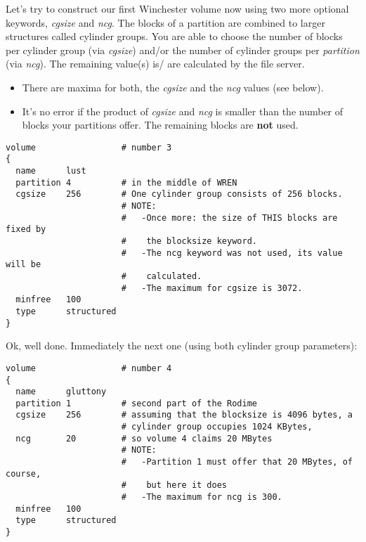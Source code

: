 Let's try to construct our first Winchester volume now using two more optional
keywords, {\it cgsize} and
{\it ncg}. The blocks of a partition are combined to
larger structures called cylinder groups. You are able to choose the number of
blocks per cylinder group (via {\it cgsize}) and/or the number of cylinder
groups per {\it partition} (via {\it ncg}). The remaining value(s) is\slash
are calculated by the file server.

\begin{note}

  \begin{itemize}

    \item There are maxima for both, the {\it cgsize} and the {\it ncg} values
          (see below).

    \item It's no error if the product of {\it cgsize} and {\it ncg} is
          smaller than the number of blocks your partitions offer. The
          remaining blocks are {\bf not} used.

  \end{itemize}

\end{note}

\begin{listing}
  \begin{verbatim}
volume                 # number 3
{
  name      lust       
  partition 4          # in the middle of WREN
  cgsize    256        # One cylinder group consists of 256 blocks.
                       # NOTE:
                       #   -Once more: the size of THIS blocks are fixed by
                       #    the blocksize keyword.
                       #   -The ncg keyword was not used, its value will be
                       #    calculated.
                       #   -The maximum for cgsize is 3072.
  minfree   100
  type      structured 
}
  \end{verbatim}
\end{listing}

Ok, well done. Immediately the next one (using both cylinder group parameters):

\begin{listing}
  \begin{verbatim}
volume                 # number 4
{
  name      gluttony
  partition 1          # second part of the Rodime
  cgsize    256        # assuming that the blocksize is 4096 bytes, a
                       # cylinder group occupies 1024 KBytes,
  ncg       20         # so volume 4 claims 20 MBytes
                       # NOTE:
                       #   -Partition 1 must offer that 20 MBytes, of course,
                       #    but here it does
                       #   -The maximum for ncg is 300.
  minfree   100
  type      structured 
}
  \end{verbatim}
\end{listing}

